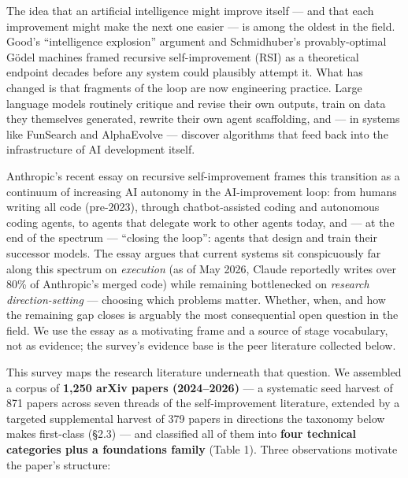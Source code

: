 \documentclass[
  11pt,
]{article}
\begin{document}
The idea that an artificial intelligence might improve itself --- and
that each improvement might make the next one easier --- is among the
oldest in the field. Good's ``intelligence explosion'' argument
\citep{good1966ultraintelligent} and Schmidhuber's provably-optimal
Gödel machines \citep{schmidhuber2003godel} framed recursive
self-improvement (RSI) as a theoretical endpoint decades before any
system could plausibly attempt it. What has changed is that fragments of
the loop are now engineering practice. Large language models routinely
critique and revise their own outputs, train on data they themselves
generated, rewrite their own agent scaffolding, and --- in systems like
FunSearch \citep{romeraparedes2024funsearch} and AlphaEvolve
\citep{novikov2025alphaevolve} --- discover algorithms that feed back
into the infrastructure of AI development itself.

Anthropic's recent essay on recursive self-improvement
\citep{anthropic2026rsi} frames this transition as a continuum of
increasing AI autonomy in the AI-improvement loop: from humans writing
all code (pre-2023), through chatbot-assisted coding and autonomous
coding agents, to agents that delegate work to other agents today, and
--- at the end of the spectrum --- ``closing the loop'': agents that
design and train their successor models. The essay argues that current
systems sit conspicuously far along this spectrum on \emph{execution}
(as of May 2026, Claude reportedly writes over 80\% of Anthropic's
merged code) while remaining bottlenecked on \emph{research
direction-setting} --- choosing which problems matter. Whether, when,
and how the remaining gap closes is arguably the most consequential open
question in the field. We use the essay as a motivating frame and a
source of stage vocabulary, not as evidence; the survey's evidence base
is the peer literature collected below.

This survey maps the research literature underneath that question. We
assembled a corpus of \textbf{1,250 arXiv papers (2024--2026)} --- a
systematic seed harvest of 871 papers across seven threads of the
self-improvement literature, extended by a targeted supplemental harvest
of 379 papers in directions the taxonomy below makes first-class (§2.3)
--- and classified all of them into \textbf{four technical categories
plus a foundations family} (Table 1). Three observations motivate the
paper's structure:
\end{document}
